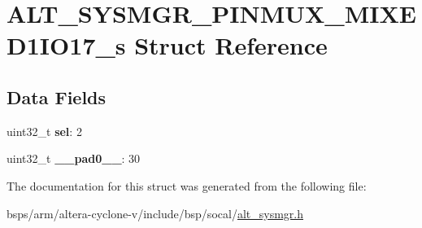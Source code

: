 \hypertarget{structALT__SYSMGR__PINMUX__MIXED1IO17__s}{}\section{A\+L\+T\+\_\+\+S\+Y\+S\+M\+G\+R\+\_\+\+P\+I\+N\+M\+U\+X\+\_\+\+M\+I\+X\+E\+D1\+I\+O17\+\_\+s Struct Reference}
\label{structALT__SYSMGR__PINMUX__MIXED1IO17__s}
\subsection*{Data Fields}
\begin{DoxyCompactItemize}
\item 
\mbox{\label{structALT__SYSMGR__PINMUX__MIXED1IO17__s_a0b4bbab8c53e30144cf8ef5a03d080e2}} 
uint32\+\_\+t {\bfseries sel}\+: 2
\item 
\mbox{\label{structALT__SYSMGR__PINMUX__MIXED1IO17__s_aaae42c058fcb0ad12decdca9c8562fa7}} 
uint32\+\_\+t {\bfseries \+\_\+\+\_\+pad0\+\_\+\+\_\+}\+: 30
\end{DoxyCompactItemize}


The documentation for this struct was generated from the following file\+:\begin{DoxyCompactItemize}
\item 
bsps/arm/altera-\/cyclone-\/v/include/bsp/socal/\mbox{\hyperlink{alt__sysmgr_8h}{alt\+\_\+sysmgr.\+h}}\end{DoxyCompactItemize}
